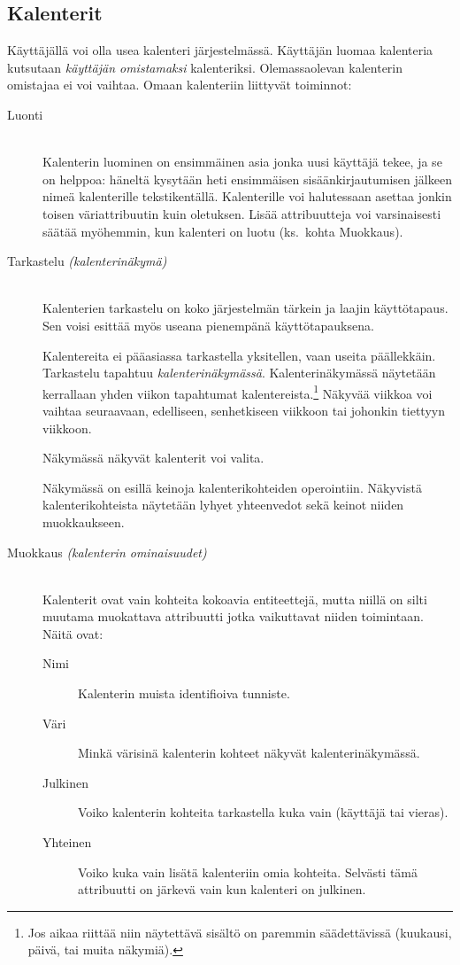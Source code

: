 \documentclass[a4paper,12pt]{report}
\begin{document}
\subsection{Kalenterit}\label{oma_kalenteri}
Käyttäjällä voi olla usea kalenteri järjestelmässä.  Käyttäjän luomaa kalenteria
kutsutaan \emph{käyttäjän omistamaksi} kalenteriksi.  Olemassaolevan kalenterin
omistajaa ei voi vaihtaa.  Omaan kalenteriin liittyvät toiminnot:
\begin{description}
   \item[Luonti] \hfill\\
      Kalenterin luominen on ensimmäinen asia jonka uusi
      käyttäjä tekee, ja se on helppoa: häneltä kysytään heti ensimmäisen
      sisäänkirjautumisen jälkeen nimeä kalenterille tekstikentällä.
      Kalenterille voi halutessaan asettaa jonkin toisen väriattribuutin kuin
      oletuksen.  Lisää attribuutteja voi varsinaisesti säätää myöhemmin, kun
      kalenteri on luotu (ks.\ kohta Muokkaus).

   \item[Tarkastelu {\it (kalenterinäkymä)}] \hfill\\
      Kalenterien tarkastelu on koko järjestelmän tärkein ja laajin
      käyttötapaus.  Sen voisi esittää myös useana pienempänä käyttötapauksena.

      Kalentereita ei pääasiassa tarkastella yksitellen, vaan useita
      päällekkäin.  Tarkastelu tapahtuu \emph{kalenterinäkymässä}.
      Kalenterinäkymässä näytetään kerrallaan yhden viikon tapahtumat
      kalentereista.\footnote{%
         Jos aikaa riittää niin näytettävä sisältö on paremmin säädettävissä
         (kuukausi, päivä, tai muita näkymiä).
      }  Näkyvää viikkoa voi vaihtaa seuraavaan, edelliseen, senhetkiseen
      viikkoon tai johonkin tiettyyn viikkoon.

      Näkymässä näkyvät kalenterit voi valita.

      Näkymässä on esillä keinoja kalenterikohteiden operointiin.  Näkyvistä
      kalenterikohteista näytetään lyhyet yhteenvedot sekä keinot niiden
      muokkaukseen.
   \item[Muokkaus {\it (kalenterin ominaisuudet)}] \hfill\\
      Kalenterit ovat vain kohteita kokoavia entiteettejä, mutta niillä on silti
      muutama muokattava attribuutti jotka vaikuttavat niiden toimintaan. Näitä
      ovat:
      \begin{description}
         \item[Nimi]  Kalenterin muista identifioiva tunniste.
         \item[Väri]  Minkä värisinä kalenterin kohteet näkyvät
            kalenterinäkymässä.
         \item[Julkinen]  Voiko kalenterin kohteita tarkastella kuka vain
            (käyttäjä tai vieras).
         \item[Yhteinen]  Voiko kuka vain lisätä kalenteriin omia kohteita.
            Selvästi tämä attribuutti on järkevä vain kun kalenteri on
            julkinen.  
      \end{description}


\end{description}
\end{document}
